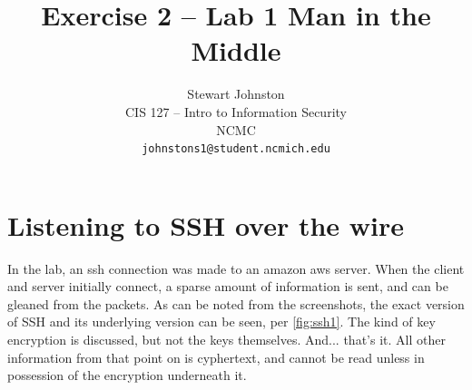\documentclass{article}
\title{Exercise 2 -- Lab 1 Man in the Middle}
\author{Stewart Johnston\\
  {CIS 127 -- Intro to Information Security}\\
  {NCMC}\\
  {\texttt{johnstons1@student.ncmich.edu}}
}
\date{}
\begin{document}
\maketitle

\section{Listening to SSH over the wire}

In the lab, an ssh connection was made to an amazon aws server. When the client
and server initially connect, a sparse amount of information is sent, and can
be gleaned from the packets. As can be noted from the screenshots, the exact
version of SSH and its underlying version can be seen, per \ref{fig:ssh1}. The kind of key
encryption is discussed, but not the keys themselves. And... that's it. All
other information from that point on is cyphertext, and cannot be read unless
in possession of the encryption underneath it.
\end{document}
